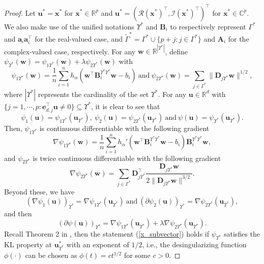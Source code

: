 \documentclass{article}
\numberwithin{equation}{section}
\begin{document}
\begin{proof}
Let $\mathbf{u}^*=\mathbf{x}^*$ for $\mathbf{x}^*\in\mathbb{R}^p$ and $\mathbf{u}^*=(\mathcal{R}(\mathbf{x}^*)^\top, \mathcal{I}(\mathbf{x}^*)^\top)^\top$ for $\mathbf{x}^*\in\mathbb{C}^p$. We also make use of the unified notations $\Upsilon^*$ and $\mathbf{B}_i$ to respectively represent $\Gamma^*$ and $\mathbf{a}_i\mathbf{a}_i^\top$ for the real-valued case, and $\tilde{\Gamma}^*=\Gamma^*\cup\{p+j: j\in\Gamma^*\}$ and $\mathbf{A}_i$ for the complex-valued case, respectively.
For any $\mathbf{w}\in\mathbb{R}^{|\Upsilon^*|}$, define $\psi_{\Upsilon^*}(\mathbf{w})=\psi_{1\Upsilon^*}(\mathbf{w})+\lambda\psi_{2\Upsilon^*}(\mathbf{w})$ with
$$\psi_{1\Upsilon^*}(\mathbf{w})=\frac{1}{n}\sum_{i=1}^nh_\alpha(\mathbf{w}^\top\mathbf{B}_i^{\Upsilon^*\Upsilon^*}\mathbf{w}-b_i)~\mbox{and}~
\psi_{2\Upsilon^*}(\mathbf{w})=\sum_{j\in\Gamma^*}\|\mathbf{D}_{j\Upsilon^*}\mathbf{w}\|^{1/2},$$
where $|\Upsilon^*|$ represents the cardinality of the set $\Upsilon^*$.  
For any $\mathbf{u}\in\mathbb{R}^d$ with $\{j=1,\cdots,p: \mathbf{e}_{d,j}^\top\mathbf{u}\neq0\}\subseteq\Upsilon^*$, it is clear to see that
$$\psi_1(\mathbf{u})=\psi_{1\Upsilon^*}(\mathbf{u}_{\Upsilon^*}),~\psi_2(\mathbf{u})=\psi_{2\Upsilon^*}(\mathbf{u}_{\Upsilon^*})
~\mbox{and}~
\psi(\mathbf{u})=\psi_{\Upsilon^*}(\mathbf{u}_{\Upsilon^*}).$$ Then, $\psi_{1\Upsilon^*}$ is continuous differentiable with the following gradient
$$\nabla\psi_{1\Upsilon^*}(\mathbf{w})=\frac{1}{n}\sum_{i=1}^nh_\alpha'(\mathbf{w}^\top\mathbf{B}_i^{\Upsilon^*\Upsilon^*}\mathbf{w}-b_i)\mathbf{B}_i^{\Upsilon^*\Upsilon^*}
\mathbf{w},$$
and $\psi_{2\Upsilon^*}$ is twice continuous differentiable with the following gradient
$$\nabla\psi_{2\Upsilon^*}(\mathbf{w})=\sum_{j\in\Gamma^*}\mathbf{D}_{j\Upsilon^*}^\top \frac{\mathbf{D}_{j\Upsilon^*}\mathbf{w}}{2\|\mathbf{D}_{j\Upsilon^*}\mathbf{w}\|^{3/2}}.$$
Beyond these, we have
$$(\nabla\psi_1(\mathbf{u}))_{\Upsilon^*}=\nabla\psi_{1\Upsilon^*}(\mathbf{u}_{\Upsilon^*})~\mbox{and}~ (\partial\psi_2(\mathbf{u}))_{\Upsilon^*}=\nabla\psi_{2\Upsilon^*}(\mathbf{u}_{\Upsilon^*}),$$
and then
$$(\partial\psi(\mathbf{u}))_{\Upsilon^*}=\nabla\psi_{1\Upsilon^*}(\mathbf{u}_{\Upsilon^*})+\lambda\nabla\psi_{2\Upsilon^*}(\mathbf{u}_{\Upsilon^*}).$$
Recall Theorem 2 in \cite{attouch2009convergence}, then the statement (\ref{x_subvector}) holds if $\psi_{\Upsilon^*}$ satisfies the KL property at $\mathbf{u}_{\Upsilon^*}^*$ with an exponent of $1/2$, i.e., the desingularizing function $\phi(\cdot)$ can be chosen as $\phi(t)=ct^{1/2}$ for some $c>0$.


\end{proof}
\end{document}
